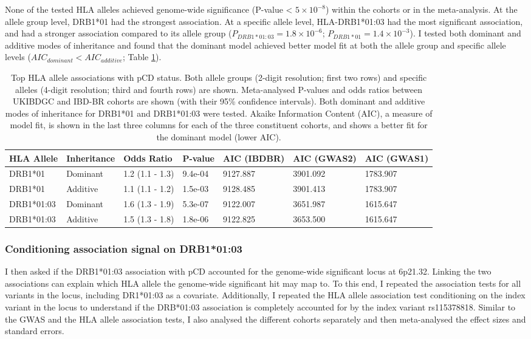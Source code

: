 None of the tested HLA alleles achieved genome-wide significance (P-value < $5\times10^{-8}$) within the cohorts or in the meta-analysis. At the allele group level, DRB1*01 had the strongest association. At a specific allele level, HLA-DRB1*01:03 had the most significant association, and had a stronger association compared to its allele group ($P_{DRB1*01:03}=1.8\times10^{-6}$; $P_{DRB1*01}=1.4\times10^{-3}$). I tested both dominant and additive modes of inheritance and found that the dominant model achieved better model fit at both the allele group and specific allele levels ($AIC_{dominant} < AIC_{additive}$; Table \ref{table:hla_allele_assoc}). 
\begin{table}[H]
  
  \centering\begingroup\fontsize{9}{10}\selectfont
  \caption[HLA alleles with strongest association with pCD]{Top HLA allele associations with pCD status. Both allele groups (2-digit resolution; first two rows) and specific alleles (4-digit resolution; third and fourth rows) are shown. Meta-analysed P-values and odds ratios between UKIBDGC and IBD-BR cohorts are shown (with their 95\% confidence intervals). Both dominant and additive modes of inheritance  for  DRB1*01 and DRB1*01:03 were tested. Akaike Information Content (AIC), a measure of model fit, is shown in the last three columns for each of the three constituent cohorts, and shows a better fit for the dominant model (lower AIC).}
  \label{table:hla_allele_assoc}
  \begin{tabular}[t]{|l|l|l|l|l|l|l|}
  \hline
  HLA Allele & Inheritance & Odds Ratio & P-value & AIC (IBDBR) & AIC (GWAS2) & AIC (GWAS1)\\
  \hline
  DRB1*01 & Dominant & 1.2 (1.1 - 1.3) & 9.4e-04 & 9127.887 & 3901.092 & 1783.907\\
  \hline
  DRB1*01 & Additive & 1.1 (1.1 - 1.2) & 1.5e-03 & 9128.485 & 3901.413 & 1783.907\\
  \hline
  DRB1*01:03 & Dominant & 1.6 (1.3 - 1.9) & 5.3e-07 & 9122.007 & 3651.987 & 1615.647\\
\hline
DRB1*01:03 & Additive & 1.5 (1.3 - 1.8) & 1.8e-06 & 9122.825 & 3653.500 & 1615.647\\
\hline
  \end{tabular}
  \endgroup{}
  \end{table}
\subsubsection{Conditioning association signal on DRB1*01:03}
I then asked if the DRB1*01:03 association with pCD accounted for the genome-wide significant locus at 6p21.32. Linking the two associations can explain which HLA allele the genome-wide significant hit may map to. To this end, I repeated the association tests for all variants in the locus, including DR1*01:03 as a covariate. Additionally, I repeated the HLA allele association test conditioning on the index variant in the locus to understand if the DRB*01:03 association is completely accounted for by the index variant rs115378818. Similar to the GWAS and the HLA allele association tests, I also analysed the different cohorts separately and then meta-analysed the effect sizes and standard errors.\\


